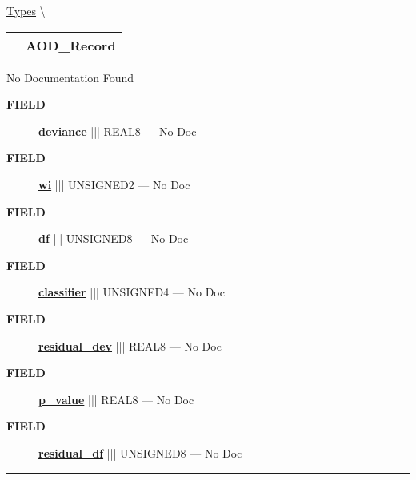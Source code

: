 \hypertarget{ecldoc:logisticregression.types.aod_record}{}
\hspace{0pt} \hyperlink{ecldoc:LogisticRegression.Types}{Types} \textbackslash 

{\renewcommand{\arraystretch}{1.5}
\begin{tabularx}{\textwidth}{|>{\raggedright\arraybackslash}l|X|}
\hline
\hspace{0pt}\mytexttt{\color{red} } & \textbf{AOD\_Record} \\
\hline
\end{tabularx}
}

\par





No Documentation Found







\par
\begin{description}
\item [\colorbox{tagtype}{\color{white} \textbf{\textsf{FIELD}}}] \textbf{\underline{deviance}} ||| REAL8 --- No Doc
\item [\colorbox{tagtype}{\color{white} \textbf{\textsf{FIELD}}}] \textbf{\underline{wi}} ||| UNSIGNED2 --- No Doc
\item [\colorbox{tagtype}{\color{white} \textbf{\textsf{FIELD}}}] \textbf{\underline{df}} ||| UNSIGNED8 --- No Doc
\item [\colorbox{tagtype}{\color{white} \textbf{\textsf{FIELD}}}] \textbf{\underline{classifier}} ||| UNSIGNED4 --- No Doc
\item [\colorbox{tagtype}{\color{white} \textbf{\textsf{FIELD}}}] \textbf{\underline{residual\_dev}} ||| REAL8 --- No Doc
\item [\colorbox{tagtype}{\color{white} \textbf{\textsf{FIELD}}}] \textbf{\underline{p\_value}} ||| REAL8 --- No Doc
\item [\colorbox{tagtype}{\color{white} \textbf{\textsf{FIELD}}}] \textbf{\underline{residual\_df}} ||| UNSIGNED8 --- No Doc
\end{description}





\rule{\linewidth}{0.5pt}


